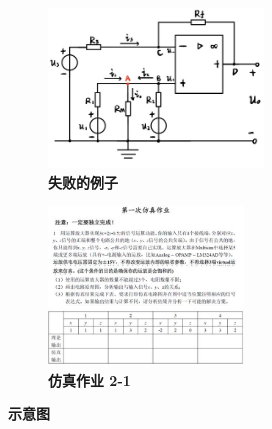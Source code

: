 \documentclass[UTF8]{report}
\theoremstyle{MyLineTheoremStyle} %
\theoremstyle{MyBlockTheoremStyle} %
\theoremstyle{MySubsubsectionStyle} %
\begin{document}
\begin{figure}[H]\centering
\begin{subfigure}[t]{0.43\textwidth}\centering
    \includegraphics[height=120pt]{assets/3/失败的例子.png}
    \caption{\bfseries 失败的例子 }
\end{subfigure}\begin{subfigure}[t]{0.43\textwidth}\centering
    \includegraphics[height=120pt]{assets/3/image (5).jpg}
    \caption{\bfseries 仿真作业 2-1 }
\end{subfigure}
\caption{\bfseries 示意图 }
\end{figure}
\end{document}
